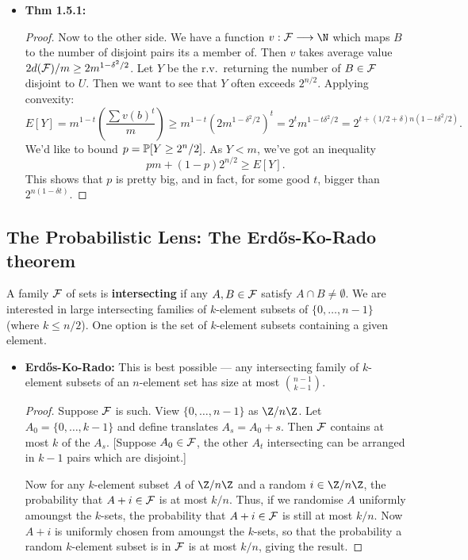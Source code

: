 \documentclass[11pt]{article}
\newenvironment{INT}[1][]{\begin{itemize}\small\item\textbf{#1}}{\end{itemize}}
\begin{document}
\begin{chapter1}
\begin{itemise}
\begin{INT}[Thm 1.5.1:]
\begin{proof}
\INDENT Now to the other side. We have a function $v:\calF\to\N$ which maps $B$ to the number of disjoint pairs its a member of. Then $v$ takes average value $2d(\mathcal{F})/m\geq2m^{1-\delta^2/2}$. Let $Y$ be the r.v.\ returning the number of $B\in \mathcal{F}$ disjoint to $U$. Then we want to see that $Y$ often exceeds $2^{n/2}$. Applying convexity:
\[E[Y]=
m^{1-t}\left(\frac{\sum v(b)^t}{m}\right)\geq m^{1-t}\left(2m^{1-\delta^2/2}\right)^t=2^tm^{1-t\delta^2/2}=2^{t+(1/2+\delta)n(1-t\delta^2/2)}.\]
We'd like to bound $p=\operatorname{\mathbb{P}}[Y\geq 2^n/2]$. As $Y<m$, we've got an inequality
\[pm+(1-p)2^{n/2}\geq E[Y].\]
This shows that $p$ is pretty big, and in fact, for some good $t$, bigger than $2^{n(1-\delta t)}$.
\end{proof}
\end{INT}
\end{itemise}
\subsection*{The Probabilistic Lens: The Erd\H{o}s-Ko-Rado theorem}
A family $\mathcal{F}$ of sets is \textbf{intersecting} if any $A,B\in\mathcal{F}$ satisfy $A\cap B\neq\emptyset$. We are interested in large intersecting families of $k$-element subsets of $\{0,\ldots, n-1\}$ (where $k\leq n/2$). One option is the set of $k$-element subsets containing a given element.
\begin{INT}[Erd\H{o}s-Ko-Rado:]
This is best possible --- any intersecting family of $k$-element subsets of an $n$-element set has size at most ${n-1\choose k-1}$.
\begin{proof}
Suppose $\mathcal{F}$ is such. View $\{0,\ldots, n-1\}$ as $\Z/n\Z$. Let $A_0=\{0,\ldots,k-1\}$ and define translates $A_s=A_0+s$. Then $\mathcal{F}$ contains at most $k$ of the $A_s$. [Suppose $A_0\in\mathcal{F}$, the other $A_t$ intersecting can be arranged in $k-1$ pairs which are disjoint.]

Now for any $k$-element subset $A$ of $\Z/n\Z$ and a random $i\in \Z/n\Z$, the probability that $A+i\in\mathcal{F}$ is at most $k/n$. Thus, if we randomise $A$ uniformly amoungst the $k$-sets, the probability that $A+i\in\mathcal{F}$ is still at most $k/n$. Now $A+i$ is uniformly chosen from amoungst the $k$-sets, so that the probability a random $k$-element subset is in $\mathcal{F}$ is at most $k/n$, giving the result.
\end{proof}
\end{INT}
\end{chapter1}
\end{document}
